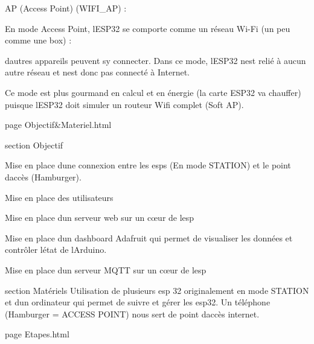 AP (Access Point) (WIFI\+\_\+\+AP) \+:
\begin{DoxyItemize}
\item En mode Access Point, l\textquotesingle{}ESP32 se comporte comme un réseau Wi-\/\+Fi (un peu comme une box) \+:
\item d\textquotesingle{}autres appareils peuvent s\textquotesingle{}y connecter. Dans ce mode, l\textquotesingle{}ESP32 n\textquotesingle{}est relié à aucun autre réseau et n\textquotesingle{}est donc pas connecté à Internet.
\item Ce mode est plus gourmand en calcul et en énergie (la carte ESP32 va chauffer) puisque l\textquotesingle{}ESP32 doit simuler un routeur Wifi complet (Soft AP).
\end{DoxyItemize}

page Objectif\&Materiel.\+html

section Objectif
\begin{DoxyItemize}
\item Mise en place d\textquotesingle{}une connexion entre les esps (En mode STATION) et le point d\textquotesingle{}accès (Hamburger).
\item Mise en place des utilisateurs
\item Mise en place d\textquotesingle{}un serveur web sur un cœur de l\textquotesingle{}esp
\item Mise en place d\textquotesingle{}un dashboard Adafruit qui permet de visualiser les données et contrôler l\textquotesingle{}état de l\textquotesingle{}Arduino.
\item Mise en place d\textquotesingle{}un serveur MQTT sur un cœur de l\textquotesingle{}esp
\end{DoxyItemize}

section Matériels Utilisation de plusieurs esp 32 originalement en mode STATION et d\textquotesingle{}un ordinateur qui permet de suivre et gérer les esp32. Un téléphone (Hamburger = ACCESS POINT) nous sert de point d\textquotesingle{}accès internet.

page Etapes.\+html

